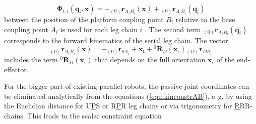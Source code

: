 \documentclass[robotics,article,submit,moreauthors,pdftex]{Definitions/mdpi}
\newcommand{\bm}[1]{\boldsymbol{#1}}
\newcommand{\ortvek}[4]{{ }_{(#1)}{\boldsymbol{#2}}^{#3}_{#4} }
\newcommand{\rotmat}[2]{{{ }^{#1}\boldsymbol{R}}_{#2}}
\begin{document}
%
\begin{equation}
\bm{\Phi}_{\mathrm{t},i}(\bm{q}_i,\bm{x}) = - \ortvek{0}{r}{}{A_iB_i}(\bm{x}) + \ortvek{0}{r}{}{A_iB_i}(\bm{q}_i) 
\label{equ:kinconstrAB}
\end{equation}
%
between the position of the platform coupling point $B_i$ relative to the base coupling point $A_i$ is used for each leg chain $i$ \cite{Merlet2006}.
The second term $\ortvek{0}{r}{}{A_iB_i}(\bm{q}_i)$ corresponds to the forward kinematics of the serial leg chain. 
The vector
\begin{equation}
\ortvek{0}{r}{}{A_iB_i}(\bm{x}) = 
- \ortvek{0}{r}{}{0A_i}
+ \bm{x}_{\mathrm{t}} + \rotmat{0}{D}(\bm{x}_{\mathrm{r}}) \ortvek{D}{r}{}{DB_i}
\label{equ:vec_AB}
\end{equation}
%
includes the term $\rotmat{0}{D}(\bm{x}_{\mathrm{r}})$ that depends on the full  orientation $\bm{x}_{\mathrm{r}}$ of the end-effector.

For the bigger part of existing parallel robots, the passive joint coordinates can be eliminated analytically from the equations (\ref{equ:kinconstrAB}), e.\,g. by using the Euclidian distance for U\underline{P}S or R\underline{P}R leg chains or via trigonometry for \underline{R}RR-chains. This leads to the scalar constraint equation
\end{document}
